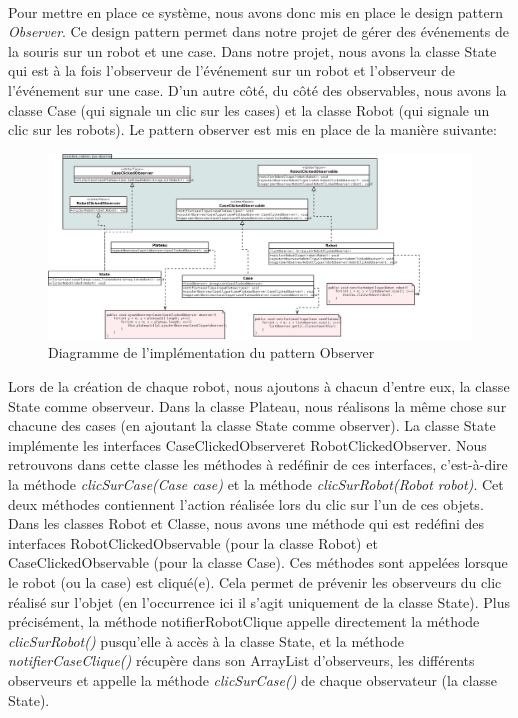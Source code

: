 \documentclass[a4paper, 12pt]{article}
\begin{document}
            \paragraph{}
            Pour mettre en place ce système, nous avons donc mis en place le design pattern \textit{Observer}. Ce design pattern permet dans notre projet de gérer des événements de la souris sur un robot et une case. Dans notre projet, nous avons la classe State qui est à la fois l'observeur de l'événement sur un robot et l'observeur de l'événement sur une case. D'un autre côté, du côté des observables, nous avons la classe Case (qui signale un clic sur les cases) et la classe Robot (qui signale un clic sur les robots). Le pattern observer est mis en place de la manière suivante:
            
           \begin{figure}[H]
                \centering
                \includegraphics[scale=0.3]{images/patternObserverRobot.png}
                \caption{Diagramme de l'implémentation du pattern Observer}
            \end{figure}
            
            Lors de la création de chaque robot, nous ajoutons à chacun d'entre eux, la classe State comme observeur. Dans la classe Plateau, nous réalisons la même chose sur chacune des cases (en ajoutant la classe State comme observer). La classe State implémente les interfaces CaseClickedObserveret RobotClickedObserver. Nous retrouvons dans cette classe les méthodes à redéfinir de ces interfaces, c'est-à-dire la méthode \textit{clicSurCase(Case case)} et la méthode \textit{clicSurRobot(Robot robot)}. Cet deux méthodes contiennent l'action réalisée lors du clic sur l'un de ces objets. Dans les classes Robot et Classe, nous avons une méthode qui est redéfini des interfaces RobotClickedObservable (pour la classe Robot) et CaseClickedObservable  (pour la classe Case). Ces méthodes sont appelées lorsque le robot (ou la case) est cliqué(e). Cela permet de prévenir les observeurs du clic réalisé sur l'objet (en l'occurrence ici il s'agit uniquement de la classe State). Plus précisément, la méthode notifierRobotClique appelle directement la méthode \textit{clicSurRobot()} pusqu'elle à accès à la classe State, et la méthode \textit{notifierCaseClique()} récupère dans son ArrayList d'observeurs, les différents observeurs et appelle la méthode \textit{clicSurCase()} de chaque observateur (la classe State).
            
\end{document}
